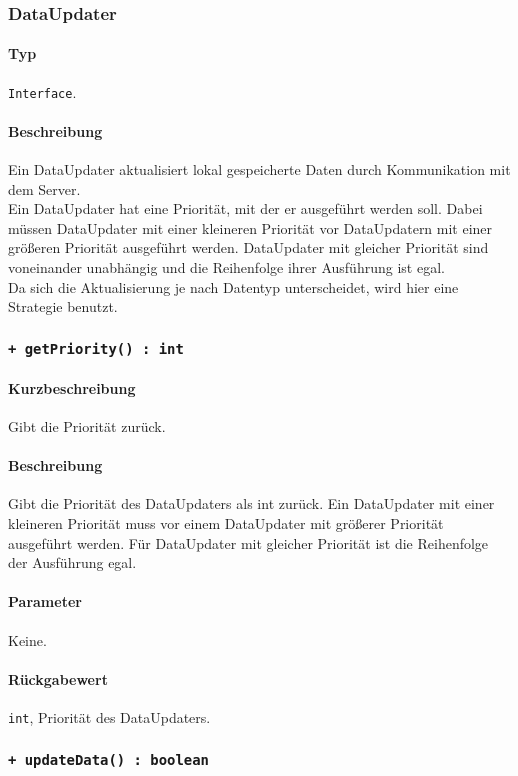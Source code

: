 \subsubsection{DataUpdater}
\paragraph*{Typ}
\texttt{Interface}.
\paragraph*{Beschreibung}
Ein DataUpdater aktualisiert lokal gespeicherte Daten durch Kommunikation mit dem Server.\\
Ein DataUpdater hat eine Priorität, mit der er ausgeführt werden soll. Dabei müssen 
DataUpdater mit einer kleineren Priorität vor DataUpdatern mit einer größeren Priorität 
ausgeführt werden. DataUpdater mit gleicher Priorität sind voneinander unabhängig und
die Reihenfolge ihrer Ausführung ist egal.\\
Da sich die Aktualisierung je nach Datentyp unterscheidet, wird hier eine Strategie benutzt.

\subsubsection*{\texttt{+ getPriority() : int}}%
\paragraph*{Kurzbeschreibung}
Gibt die Priorität zurück.
\paragraph*{Beschreibung}
Gibt die Priorität des DataUpdaters als int zurück. Ein DataUpdater mit einer kleineren
Priorität muss vor einem DataUpdater mit größerer Priorität ausgeführt werden.
Für DataUpdater mit gleicher Priorität ist die Reihenfolge der Ausführung egal.
\paragraph*{Parameter}
Keine.
\paragraph*{Rückgabewert}
\texttt{int}, Priorität des DataUpdaters.

\subsubsection*{\texttt{+ updateData() : boolean}}%
